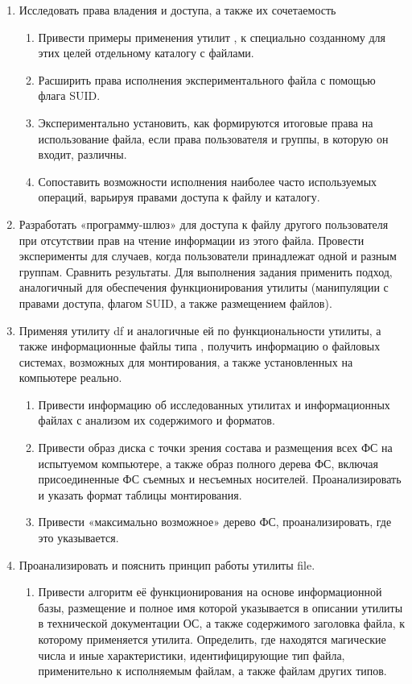 \begin{enumerate}
	\item Исследовать права владения и доступа, а также их сочетаемость
		\begin{enumerate}
			\item Привести примеры применения утилит ,  к специально созданному для этих целей отдельному каталогу с файлами.
			\item Расширить права исполнения экспериментального файла с помощью флага SUID.
			\item Экспериментально установить, как формируются итоговые права на использование файла, если права пользователя и группы, в которую он входит, различны.
			\item Сопоставить возможности исполнения наиболее часто используемых операций, варьируя правами доступа к файлу и каталогу.
		\end{enumerate}
	\item Разработать «программу-шлюз» для доступа к файлу другого пользователя при отсутствии прав на чтение информации из этого файла. Провести эксперименты для случаев, когда пользователи принадлежат одной и разным группам. Сравнить результаты. Для выполнения задания применить подход, аналогичный для обеспечения функционирования утилиты  (манипуляции с правами доступа, флагом SUID, а также размещением файлов).
	\item Применяя утилиту df и аналогичные ей по функциональности утилиты, а также информационные файлы типа , получить информацию о файловых системах, возможных для монтирования, а также установленных на компьютере реально.
		\begin{enumerate}
			\item Привести информацию об исследованных утилитах и информационных файлах с анализом их содержимого и форматов.
			\item Привести образ диска с точки зрения состава и размещения всех ФС на испытуемом компьютере, а также образ полного дерева ФС, включая присоединенные ФС съемных и несъемных носителей. Проанализировать и указать формат таблицы монтирования.
			\item Привести «максимально возможное» дерево ФС, проанализировать, где это указывается.
		\end{enumerate}
	\item Проанализировать и пояснить принцип работы утилиты file.
		\begin{enumerate}
			\item Привести алгоритм её функционирования на основе информационной базы, размещение и полное имя которой указывается в описании утилиты в технической документации ОС, а также содержимого заголовка файла, к которому применяется утилита. Определить, где находятся магические числа и иные характеристики, идентифицирующие тип файла, применительно к исполняемым файлам, а также файлам других типов.

\end{enumerate}
\end{enumerate}
